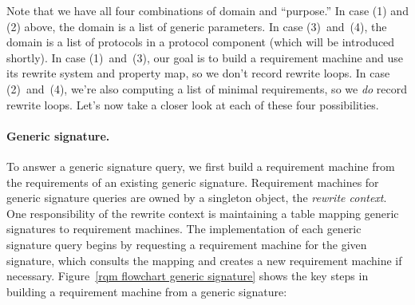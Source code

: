 \documentclass[../generics]{subfiles}
\begin{document}
Note that we have all four combinations of domain and ``purpose.'' In case (1) and (2) above, the domain is a list of generic parameters. In case (3)~and~(4), the domain is a list of protocols in a protocol component (which will be introduced shortly). In case (1)~and~(3), our goal is to build a requirement machine and use its rewrite system and property map, so we don't record rewrite loops. In case (2)~and~(4), we're also computing a list of minimal requirements, so we \emph{do} record rewrite loops. Let's now take a closer look at each of these four possibilities.

\paragraph{Generic signature.}
%
%
%
%
%
%
To answer a generic signature query, we first build a requirement machine from the requirements of an existing generic signature. Requirement machines for generic signature queries are owned by a singleton object, the \emph{rewrite context}. One responsibility of the rewrite context is maintaining a table mapping generic signatures to requirement machines. The implementation of each generic signature query begins by requesting a requirement machine for the given signature, which consults the mapping and creates a new requirement machine if necessary. Figure~\ref{rqm flowchart generic signature} shows the key steps in building a requirement machine from a generic signature:
\end{document}
